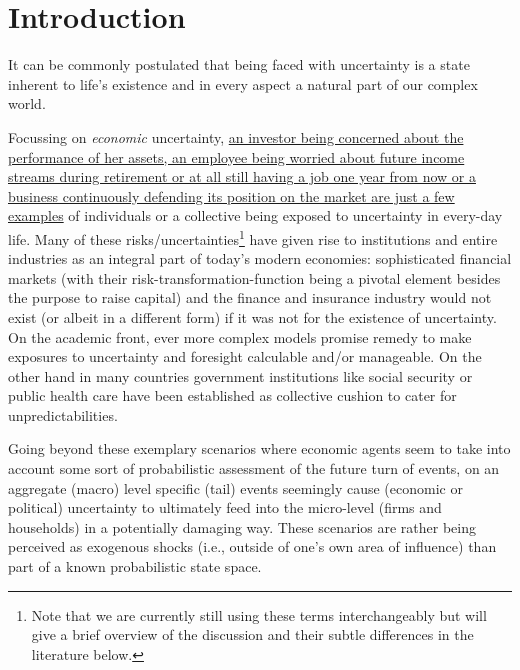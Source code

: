 \documentclass[a4paper,11pt,listof=nochaptergap,oneside,pointednumbers,bibtotoc,bigheadings,liststotoc,hidelinks]{scrbook}
\theoremstyle{mysatz}
\theoremstyle{mydefinition}
\theoremstyle{mytheorem}
\theoremstyle{mybemerkung}
\begin{document}
\chapter{Introduction}
\label{introduction}
It can be commonly postulated that being faced with uncertainty is a state inherent to life's existence and in every aspect a natural part of our complex world.

Focussing on \textit{economic} uncertainty, \href{http://citeseerx.ist.psu.edu/viewdoc/download?doi=10.1.1.334.4248&rep=rep1&type=pdf}{an investor being concerned about the performance of her assets, an employee being worried about future income streams during retirement or at all still having a job one year from now or a business continuously defending its position on the market are just a few examples} of individuals or a collective being exposed to uncertainty in every-day life. Many of these risks/uncertainties\footnote{Note that we are currently still using these terms interchangeably but will give a brief overview of the discussion and their subtle differences in the literature below.} have given rise to institutions and entire industries as an integral part of today's modern economies: sophisticated financial markets (with their risk-transformation-function being a pivotal element besides the purpose to raise capital) and the finance and insurance industry would not exist (or albeit in a different form) if it was not for the existence of uncertainty. On the academic front, ever more complex models promise remedy to make exposures to uncertainty and foresight calculable and/or manageable. On the other hand in many countries government institutions like social security or public health care have been established as collective cushion to cater for unpredictabilities.

Going beyond these exemplary scenarios where economic agents seem to take into account some sort of probabilistic assessment of the future turn of events, on an aggregate (macro) level specific (tail) events seemingly cause (economic or political) uncertainty to ultimately feed into the micro-level (firms and households) in a potentially damaging way. These scenarios are rather being perceived as exogenous shocks (i.e., outside of one's own area of influence) than part of a known probabilistic state space.
\end{document}

